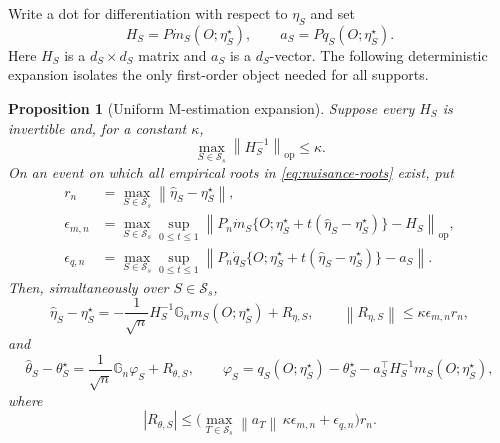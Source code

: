 \documentclass[a4paper,10pt,english]{article}
\newtheorem{proposition}{Proposition}[section]
\newcommand{\norm}[1]{\left\lVert #1\right\rVert}
\begin{document}
Write a dot for differentiation with respect to $\eta_S$ and set
\begin{equation}\label{eq:population-derivatives}
        H_S=P\dot m_S(O;\eta_S^\star),
        \qquad
        a_S=P\dot q_S(O;\eta_S^\star).
\end{equation}
Here $H_S$ is a $d_S\times d_S$ matrix and $a_S$ is a $d_S$-vector.  The
following deterministic expansion isolates the only first-order object
needed for all supports.

\begin{proposition}[Uniform M-estimation expansion]
\label{prop:first-order}
Suppose every $H_S$ is invertible and, for a constant $\kappa$,
\begin{equation*}
        \max_{S\in\mathcal S_s}\norm{H_S^{-1}}_{\mathrm{op}}\le\kappa.
\end{equation*}
On an event on which all empirical roots in \eqref{eq:nuisance-roots}
exist, put
\begin{align*}
 r_n&=\max_{S\in\mathcal S_s}\norm{\hat\eta_S-\eta_S^\star},\\
 \epsilon_{m,n}
 &=\max_{S\in\mathcal S_s}\sup_{0\le t\le1}
 \norm{P_n\dot m_S\{O;\eta_S^\star
 +t(\hat\eta_S-\eta_S^\star)\}-H_S}_{\mathrm{op}},\\
 \epsilon_{q,n}
 &=\max_{S\in\mathcal S_s}\sup_{0\le t\le1}
 \norm{P_n\dot q_S\{O;\eta_S^\star
 +t(\hat\eta_S-\eta_S^\star)\}-a_S}.
\end{align*}
Then, simultaneously over $S\in\mathcal S_s$,
\begin{equation}\label{eq:nuisance-first-order}
 \hat\eta_S-\eta_S^\star
 =-\frac1{\sqrt n}H_S^{-1}\mathbb G_nm_S(O;\eta_S^\star)
 +R_{\eta,S},
 \qquad
 \norm{R_{\eta,S}}\le\kappa\epsilon_{m,n}r_n,
\end{equation}
and
\begin{equation}\label{eq:target-first-order}
 \hat\theta_S-\theta_S^\star
 =\frac1{\sqrt n}\mathbb G_n\varphi_S+R_{\theta,S},
 \qquad
 \varphi_S
 =q_S(O;\eta_S^\star)-\theta_S^\star
 -a_S^\top H_S^{-1}m_S(O;\eta_S^\star),
\end{equation}
where
\begin{equation}\label{eq:first-order-remainder}
 |R_{\theta,S}|
 \le
 \bigl(\max_{T\in\mathcal S_s}\norm{a_T}\,
       \kappa\epsilon_{m,n}+\epsilon_{q,n}\bigr)r_n.
\end{equation}
\end{proposition}
\end{document}
